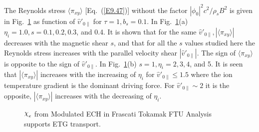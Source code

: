 \documentclass[a4paper,openany,12pt]{book}
\def\chix{\raise.5ex\hbox{$\chi$}}
\begin{document}
{The Reynolds stress $\langle\pi_{xy}\rangle$ [Eq.~(\ref{E9.47})] without the factor $|\phi_0|^2c^2/\rho_sB^2$ is given in Fig.~\ref{F9.39} as function of $\widehat v'_{0\|}$ for $\tau=1, b_s=0.1$. In Fig.~\ref{F9.39}(a) $\eta_i=1.0, s=0.1, 0.2, 0.3$, and 0.4. It is shown that for the same $\widehat v'_{0\|}, |\langle\pi_{xy}\rangle|$ decreases with the magnetic shear $s$, and that for all the $s$ values studied here the Reynolds stress increases with the parallel velocity shear $|\widehat v'_{0\|}|$. The sign of $\langle\pi_{xy}\rangle$ is opposite to the sign of $\widehat v'_{0\|}$. In Fig.~\ref{F9.39}(b) $s=1, \eta_i=2,3,4$, and 5. It is seen that $|\langle\pi_{xy}\rangle|$ increases with the increasing of $\eta_i$ for $\widehat v'_{0\|}\le 1.5$ where the ion temperature gradient is the dominant driving force. For $\widehat v'_{0\|}\sim 2$ it is the opposite, $|\langle\pi_{xy}\rangle|$ increases with the decreasing of $\eta_i$.
%
\begin{figure}[H]
\centerline{}
\caption{$\chix_e$ from Modulated ECH in Frascati Tokamak FTU Analysis supports ETG transport.}
\label{F9.39}
\end{figure}
%

}
\end{document}
